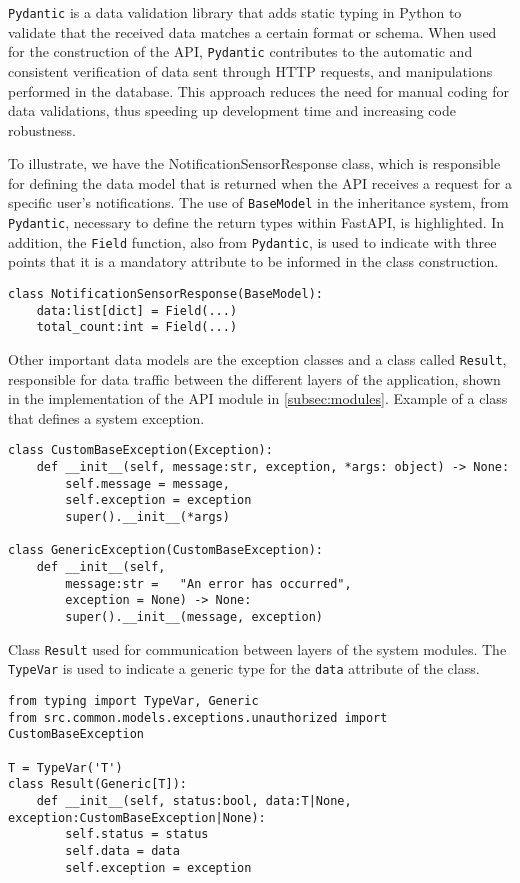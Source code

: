 \texttt{Pydantic} \cite{pydanticDocs} is a data validation library that adds static typing in Python to validate that the received data matches a certain format or schema. When used for the construction of the \gls{API}, \texttt{Pydantic} contributes to the automatic and consistent verification of data sent through \gls{HTTP} requests, and manipulations performed in the database. This approach reduces the need for manual coding for data validations, thus speeding up development time and increasing code robustness.

To illustrate, we have the NotificationSensorResponse class, which is responsible for defining the data model that is returned when the \gls{API} receives a request for a specific user's notifications. The use of \texttt{BaseModel} in the inheritance system, from \texttt{Pydantic}, necessary to define the return types within FastAPI, is highlighted. In addition, the \texttt{Field} function, also from \texttt{Pydantic}, is used to indicate with three points that it is a mandatory attribute to be informed in the class construction.

\begin{verbatim}
class NotificationSensorResponse(BaseModel):
    data:list[dict] = Field(...)
    total_count:int = Field(...)
\end{verbatim}

Other important data models are the exception classes and a class called \texttt{Result}, responsible for data traffic between the different layers of the application, shown in the implementation of the \gls{API} module in \ref{subsec:modules}.
Example of a class that defines a system exception.

\begin{verbatim}
class CustomBaseException(Exception):
    def __init__(self, message:str, exception, *args: object) -> None:
        self.message = message,
        self.exception = exception
        super().__init__(*args)

class GenericException(CustomBaseException):
    def __init__(self,
        message:str =   "An error has occurred",
        exception = None) -> None:
        super().__init__(message, exception)
\end{verbatim}


Class \texttt{Result} used for communication between layers of the system modules. The \texttt{TypeVar} is used to indicate a generic type for the \texttt{data} attribute of the class.

\begin{verbatim}
from typing import TypeVar, Generic
from src.common.models.exceptions.unauthorized import CustomBaseException

T = TypeVar('T')
class Result(Generic[T]):
    def __init__(self, status:bool, data:T|None, exception:CustomBaseException|None):
        self.status = status
        self.data = data
        self.exception = exception
\end{verbatim}

